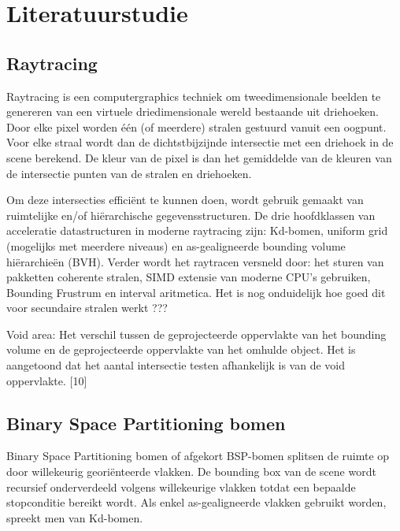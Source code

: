 \chapter{Literatuurstudie}
\label{hoofdstuk:literature}

\section{Raytracing}
Raytracing is een computergraphics techniek om tweedimensionale beelden te genereren van een virtuele driedimensionale wereld bestaande uit driehoeken.
Door elke pixel worden één (of meerdere) stralen gestuurd vanuit een oogpunt.
Voor elke straal wordt dan de dichtstbijzijnde intersectie met een driehoek in de scene berekend.
De kleur van de pixel is dan het gemiddelde van de kleuren van de intersectie punten van de stralen en driehoeken.

Om deze intersecties efficiënt te kunnen doen, wordt gebruik gemaakt van ruimtelijke en/of hiërarchische gegevensstructuren.
De drie hoofdklassen van acceleratie datastructuren in moderne raytracing zijn: Kd-bomen, uniform grid (mogelijks met meerdere niveaus) en as-gealigneerde bounding volume hiërarchieën (BVH). 
Verder wordt het raytracen versneld door: het sturen van pakketten coherente stralen, SIMD extensie van moderne CPU's gebruiken, Bounding Frustrum en interval aritmetica.
Het is nog onduidelijk hoe goed dit voor secundaire stralen werkt ???

Void area: Het verschil tussen de geprojecteerde oppervlakte van het bounding volume en de geprojecteerde oppervlakte van het omhulde object.
Het is aangetoond dat het aantal intersectie testen afhankelijk is van de void oppervlakte. [10]

\section{Binary Space Partitioning bomen}
Binary Space Partitioning bomen of afgekort BSP-bomen splitsen de ruimte op door willekeurig georiënteerde vlakken.
De bounding box van de scene wordt recursief onderverdeeld volgens willekeurige vlakken totdat een bepaalde stopconditie bereikt wordt.
Als enkel as-gealigneerde vlakken gebruikt worden, spreekt men van Kd-bomen.

